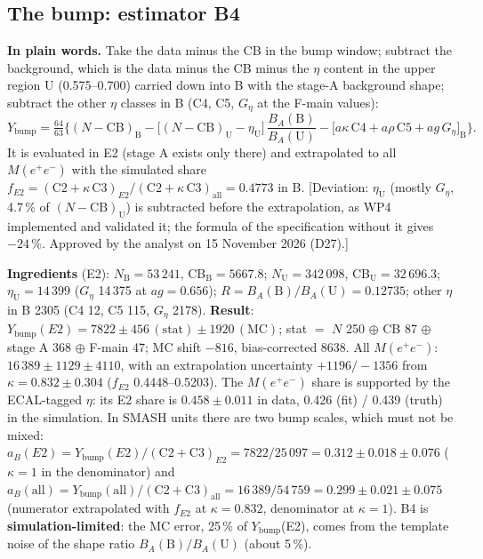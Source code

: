 \documentclass[11pt,a4paper]{article}
\newcommand{\Mee}{\ensuremath{M(e^{+}e^{-})}\xspace}
\newcommand{\Ybump}{\ensuremath{Y_{\mathrm{bump}}}\xspace}
\newcommand{\Geta}{\ensuremath{G_\eta}\xspace}
\newcommand{\flag}[1]{\textcolor{red!60!black}{[#1]}}
\begin{document}
\subsection{The bump: estimator B4}
\label{sec:b4}
\textbf{In plain words.} Take the data minus the CB in the bump window; subtract the background, which is the data minus the CB minus the
$\eta$ content in the upper region U (0.575--0.700) carried down into B with the stage-A background shape; subtract the other $\eta$ classes in
B (C4, C5, \Geta at the F-main values):
\begin{equation}
\Ybump=\tfrac{64}{63}\Big\{(N-\mathrm{CB})_{\mathrm{B}}-\big[(N-\mathrm{CB})_{\mathrm{U}}-\eta_{\mathrm{U}}\big]\,\frac{B_A(\mathrm{B})}{B_A(\mathrm{U})}
-\big[a\kappa\,\mathrm{C4}+a\rho\,\mathrm{C5}+ag\,\Geta\big]_{\mathrm{B}}\Big\}.
\label{eq:b4}
\end{equation}
It is evaluated in E2 (stage A exists only there) and extrapolated to all \Mee with the simulated share
$f_{E2}=(\mathrm{C2}+\kappa\,\mathrm{C3})_{E2}/(\mathrm{C2}+\kappa\,\mathrm{C3})_{\mathrm{all}}=0.4773$ in B. \flag{Deviation: $\eta_{\mathrm{U}}$ (mostly
\Geta, 4.7\,\% of $(N-\mathrm{CB})_{\mathrm{U}}$) is subtracted before the extrapolation, as WP4 implemented and validated it; the formula of the
specification without it gives $-24$\,\%. Approved by the analyst on 15 November 2026 (D27).}

\textbf{Ingredients} (E2): $N_{\mathrm{B}}=53\,241$, CB$_{\mathrm{B}}=5667.8$; $N_{\mathrm{U}}=342\,098$, CB$_{\mathrm{U}}=32\,696.3$;
$\eta_{\mathrm{U}}=14\,399$ (\Geta 14\,375 at $ag=0.656$); $R=B_A(\mathrm{B})/B_A(\mathrm{U})=0.12735$; other $\eta$ in B 2305 (C4 12, C5 115, \Geta
2178). \textbf{Result}: $\Ybump(E2)=7822\pm456\,(\mathrm{stat})\pm1920\,(\mathrm{MC})$; stat $=$ $N$ 250 $\oplus$ CB 87 $\oplus$ stage A 368 $\oplus$
F-main 47; MC shift $-816$, bias-corrected 8638. All \Mee: $16\,389\pm1129\pm4110$, with an extrapolation uncertainty $+1196/-1356$ from
$\kappa=0.832\pm0.304$ ($f_{E2}$ 0.4448--0.5203). The \Mee share is supported by the ECAL-tagged $\eta$: its E2 share is $0.458\pm0.011$ in
data, 0.426 (fit) / 0.439 (truth) in the simulation. In SMASH units there are two bump scales, which must not be mixed:
$a_B(E2)=\Ybump(E2)/(\mathrm{C2}+\mathrm{C3})_{E2}=7822/25\,097=0.312\pm0.018\pm0.076$ ($\kappa=1$ in the denominator) and
$a_B(\mathrm{all})=\Ybump(\mathrm{all})/(\mathrm{C2}+\mathrm{C3})_{\mathrm{all}}=16\,389/54\,759=0.299\pm0.021\pm0.075$ (numerator extrapolated
with $f_{E2}$ at $\kappa=0.832$, denominator at $\kappa=1$). B4 is
\textbf{simulation-limited}: the MC error, 25\,\% of \Ybump(E2), comes from the template noise of the shape ratio $B_A(\mathrm{B})/B_A(\mathrm{U})$
(about 5\,\%).
\end{document}
